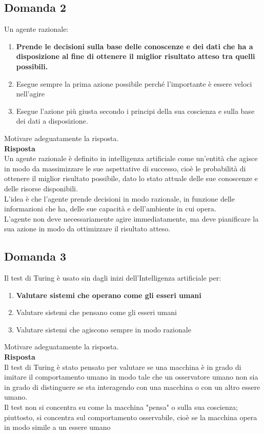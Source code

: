 \documentclass[../main.tex]{subfiles}
\begin{document}
	\subsection{Domanda 2}
	Un agente razionale:
	\begin{enumerate}
		\item \textbf{Prende le decisioni sulla base delle conoscenze e dei dati che ha a disposizione al fine di ottenere il miglior risultato atteso tra quelli possibili.}
		\item Esegue sempre la prima azione possibile perché l’importante è essere veloci nell’agire 
		\item Esegue l’azione più giusta secondo i principi della sua coscienza e sulla base dei dati a disposizione. 
	\end{enumerate}
	Motivare adeguatamente la risposta.\\
	\textbf{Risposta}\\
	Un agente razionale è definito in intelligenza artificiale come un'entità che agisce in modo da massimizzare le sue aspettative di successo, cioè le probabilità di ottenere il miglior risultato possibile, dato lo stato attuale delle sue conoscenze e delle risorse disponibili.\\
	L'idea è che l'agente prende decisioni in modo razionale, in funzione delle informazioni che ha, delle sue capacità e dell'ambiente in cui opera.\\
	L'agente non deve necessariamente agire immediatamente, ma deve pianificare la sua azione in modo da ottimizzare il risultato atteso.
	\subsection{Domanda 3}
	Il test di Turing è usato sin dagli inizi dell’Intelligenza artificiale per:
	\begin{enumerate}
		\item \textbf{Valutare sistemi che operano come gli esseri umani}
		\item Valutare sistemi che pensano come gli esseri umani 
		\item Valutare sistemi che agiscono sempre in modo razionale 
	\end{enumerate}
	Motivare adeguatamente la risposta.\\
	\textbf{Risposta}\\
	Il test di Turing è stato pensato per valutare se una macchina è in grado di imitare il comportamento umano in modo tale che un osservatore umano non sia in grado di distinguere se sta interagendo con una macchina o con un altro essere umano.\\
	Il test non si concentra su come la macchina "pensa" o sulla sua coscienza; piuttosto, si concentra sul comportamento osservabile, cioè se la macchina opera in modo simile a un essere umano
\end{document}
